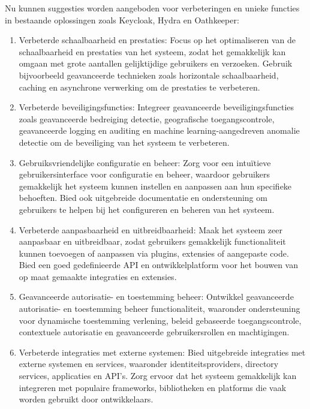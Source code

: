 Nu kunnen suggesties worden aangeboden voor verbeteringen en unieke functies in bestaande oplossingen zoals Keycloak, Hydra en Oathkeeper:

\begin{enumerate}
  \item Verbeterde schaalbaarheid en prestaties: Focus op het optimaliseren van de schaalbaarheid en prestaties van het systeem, zodat het gemakkelijk kan omgaan met grote aantallen gelijktijdige gebruikers en verzoeken. Gebruik bijvoorbeeld geavanceerde technieken zoals horizontale schaalbaarheid, caching en asynchrone verwerking om de prestaties te verbeteren.
  
  \item Verbeterde beveiligingsfuncties: Integreer geavanceerde beveiligingsfuncties zoals geavanceerde bedreiging detectie, geografische toegangscontrole, geavanceerde logging en auditing en machine learning-aangedreven anomalie detectie om de beveiliging van het systeem te verbeteren.
  
  \item Gebruiksvriendelijke configuratie en beheer: Zorg voor een intuïtieve gebruikersinterface voor configuratie en beheer, waardoor gebruikers gemakkelijk het systeem kunnen instellen en aanpassen aan hun specifieke behoeften. Bied ook uitgebreide documentatie en ondersteuning om gebruikers te helpen bij het configureren en beheren van het systeem.
  
  \item Verbeterde aanpasbaarheid en uitbreidbaarheid: Maak het systeem zeer aanpasbaar en uitbreidbaar, zodat gebruikers gemakkelijk functionaliteit kunnen toevoegen of aanpassen via plugins, extensies of aangepaste code. Bied een goed gedefinieerde API en ontwikkelplatform voor het bouwen van op maat gemaakte integraties en extensies.
  
  \item Geavanceerde autorisatie- en toestemming beheer: Ontwikkel geavanceerde autorisatie- en toestemming beheer functionaliteit, waaronder ondersteuning voor dynamische toestemming verlening, beleid gebaseerde toegangscontrole, contextuele autorisatie en geavanceerde gebruikersrollen en machtigingen.
  
  \item Verbeterde integraties met externe systemen: Bied uitgebreide integraties met externe systemen en services, waaronder identiteitsproviders, directory services, applicaties en API's. Zorg ervoor dat het systeem gemakkelijk kan integreren met populaire frameworks, bibliotheken en platforms die vaak worden gebruikt door ontwikkelaars.
\end{enumerate}

